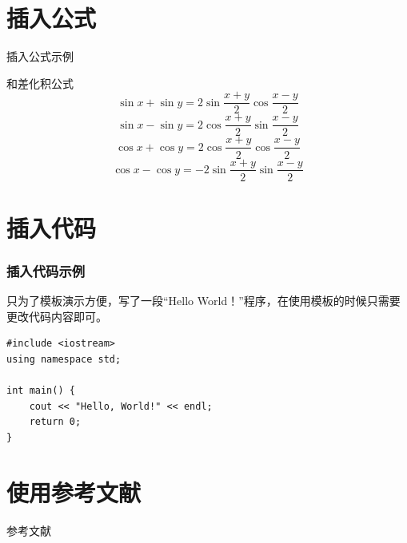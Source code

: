 \documentclass[10pt]{beamer}
\begin{document}
\section{插入公式}
\begin{frame}{插入公式示例}
\begin{block}{和差化积公式}
	\begin{equation}
	\label{hecha1}
	\sin x + \sin y = 2\sin \frac{x+y}{2} \cos \frac{x-y}{2}
	\end{equation}
	\begin{equation}
	\label{hecha2}
	\sin x - \sin y = 2\cos \frac{x+y}{2} \sin \frac{x-y}{2}
	\end{equation}
	\begin{equation}
	\label{hecha3}
	\cos x + \cos y = 2\cos \frac{x+y}{2} \cos \frac{x-y}{2}
	\end{equation}
	\begin{equation}
	\label{hecha4}
	\cos x - \cos y = -2\sin \frac{x+y}{2} \sin \frac{x-y}{2}
	\end{equation}
\end{block}
\end{frame}
\section{插入代码}
\begin{frame}[fragile]
\frametitle{插入代码示例}

只为了模板演示方便，写了一段“Hello World！”程序，在使用模板的时候只需要更改代码内容即可。
\begin{lstlisting}
#include <iostream> 
using namespace std; 

int main() { 
    cout << "Hello, World!" << endl;
    return 0;
}
\end{lstlisting}
\end{frame}

\section{使用参考文献}
\begin{frame}[allowframebreaks]{参考文献}
\printbibliography
\end{frame}
\end{document}

